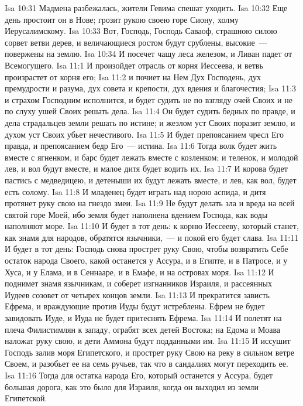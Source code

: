 \vs Isa 10:31 Мадмена разбежалась, жители Гевима спешат уходить.
\vs Isa 10:32 Еще день простоит он в Нове; грозит рукою своею горе Сиону, холму Иерусалимскому.
\vs Isa 10:33 Вот, Господь, Господь Саваоф, страшною силою сорвет ветви дерев, и величающиеся ростом будут срублены, высокие~--- повержены на землю.
\vs Isa 10:34 И посечет чащу леса железом, и Ливан падет от Всемогущего.
\vs Isa 11:1 И произойдет отрасль от корня Иессеева, и ветвь произрастет от корня его;
\vs Isa 11:2 и почиет на Нем Дух Господень, дух премудрости и разума, дух совета и крепости, дух вдения и благочестия;
\vs Isa 11:3 и страхом Господним исполнится, и будет судить не по взгляду очей Своих и не по слуху ушей Своих решать дела.
\vs Isa 11:4 Он будет судить бедных по правде, и дела страдальцев земли решать по истине; и жезлом уст Своих поразит землю, и духом уст Своих убьет нечестивого.
\vs Isa 11:5 И будет препоясанием чресл Его правда, и препоясанием бедр Его~--- истина.
\vs Isa 11:6 Тогда волк будет жить вместе с ягненком, и барс будет лежать вместе с козленком; и теленок, и молодой лев, и вол будут вместе, и малое дитя будет водить их.
\vs Isa 11:7 И корова будет пастись с медведицею, и детеныши их будут лежать вместе, и лев, как вол, будет есть солому.
\vs Isa 11:8 И младенец будет играть над норою аспида, и дитя протянет руку свою на гнездо змеи.
\vs Isa 11:9 Не будут делать зла и вреда на всей святой горе Моей, ибо земля будет наполнена вдением Господа, как воды наполняют море.
\rsbpar\vs Isa 11:10 И будет в тот день: к корню Иессееву, который станет, как знамя для народов, обратятся язычники,~--- и покой его будет слава.
\vs Isa 11:11 И будет в тот день: Господь снова прострет руку Свою, чтобы возвратить Себе остаток народа Своего, какой останется у Ассура, и в Египте, и в Патросе, и у Хуса, и у Елама, и в Сеннааре, и в Емафе, и на островах моря.
\vs Isa 11:12 И поднимет знамя язычникам, и соберет изгнанников Израиля, и рассеянных Иудеев созовет от четырех концов земли.
\vs Isa 11:13 И прекратится зависть Ефрема, и враждующие против Иуды будут истреблены. Ефрем не будет завидовать Иуде, и Иуда не будет притеснять Ефрема.
\vs Isa 11:14 И полетят на плеча Филистимлян к западу, ограбят всех детей Востока; на Едома и Моава наложат руку свою, и дети Аммона будут подданными им.
\vs Isa 11:15 И иссушит Господь залив моря Египетского, и прострет руку Свою на реку в сильном ветре Своем, и разобьет ее на семь ручьев, так что в сандалиях могут переходить ее.
\vs Isa 11:16 Тогда для остатка народа Его, который останется у Ассура, будет большая дорога, как это было для Израиля, когда он выходил из земли Египетской.
